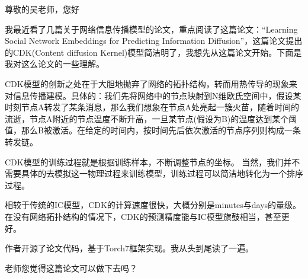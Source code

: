 \documentclass[UTF8]{ctexart}
\begin{document}
\par 尊敬的吴老师，您好
\newline
\par
我最近看了几篇关于网络信息传播模型的论文，重点阅读了这篇论文：“Learning Social Network Embeddings for Predicting Information Diffusion”，这篇论文提出的CDK(Content diffusion Kernel)模型简洁明了，我想先从这篇论文开始。下面是我对这么论文的一些理解。

\par CDK模型的创新之处在于大胆地抛弃了网络的拓扑结构，转而用热传导的现象来对信息传播建模。具体的：我们先将网络中的节点映射到N维欧氏空间中，假设某时刻节点A转发了某条消息，那么我们想象在节点A处亮起一簇火苗，随着时间的流逝，节点A附近的节点温度不断升高，一旦某节点(假设为B)的温度达到某个阈值，那么B被激活。在给定的时间内，按时间先后依次激活的节点序列则构成一条转发链。
\par CDK模型的训练过程就是根据训练样本，不断调整节点的坐标。
当然，我们并不需要具体的去模拟这一物理过程来训练模型，训练过程可以简洁地转化为一个排序过程。

相较于传统的IC模型，CDK的计算速度很快，大概分别是minutes与days的量级。
在没有网络拓扑结构的情况下，CDK的预测精度能与IC模型旗鼓相当，甚至更好。

作者开源了论文代码，基于Torch7框架实现。我从头到尾读了一遍。

\par 老师您觉得这篇论文可以做下去吗？
\par {}
\end{document}

